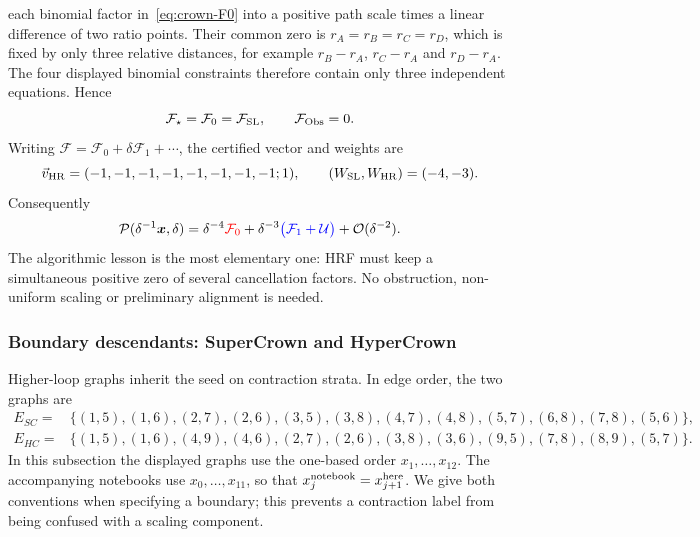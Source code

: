 \documentclass[a4paper,11pt]{article}
\newcommand{\x}{\boldsymbol{x}}
\newcommand{\FSL}{\mathcal F_{\rm SL}}
\newcommand{\FObs}{\mathcal F_{\rm Obs}}
\newcommand{\WSL}{W_{\rm SL}}
\newcommand{\WHR}{W_{\rm HR}}
\newcommand{\vHR}{\vec v_{\rm HR}}
\newcommand{\SLcolour}[1]{{\color{red}#1}}
\newcommand{\HRcolour}[1]{{\color{blue}#1}}
\newcommand{\Othercolour}[1]{{\color{black}#1}}
\begin{document}
each binomial factor in~\eqref{eq:crown-F0} into a positive path scale times
a linear difference of two ratio points.  Their common zero is
\(r_A=r_B=r_C=r_D\), which is fixed by only three relative distances, for
example \(r_B-r_A\), \(r_C-r_A\) and \(r_D-r_A\).  The four displayed
binomial constraints therefore contain only three independent equations.
Hence
\begin{equation}
 \mathcal F_\star=\mathcal F_0=\FSL,
 \qquad \FObs=0.
 \label{eq:crown-no-obstruction}
\end{equation}
Writing \(\mathcal F=\mathcal F_0+\delta\mathcal F_1+\cdots\), the certified
vector and weights are
\begin{equation}
 \vHR=(-1,-1,-1,-1,-1,-1,-1,-1;1),
 \qquad (\WSL,\WHR)=(-4,-3).
 \label{eq:crown-vector}
\end{equation}
Consequently
\begin{equation}
 \mathcal P(\delta^{-1}\x,\delta)
 =\delta^{-4}\SLcolour{\mathcal F_0}
 +\delta^{-3}\HRcolour{\bigl(\mathcal F_1+\mathcal U\bigr)}
 +\Othercolour{\mathcal O(\delta^{-2})}.
 \label{eq:crown-colours}
\end{equation}
The algorithmic lesson is the most elementary one: HRF must keep a
simultaneous positive zero of several cancellation factors.  No obstruction,
non-uniform scaling or preliminary alignment is needed.

\subsubsection{Boundary descendants: SuperCrown and HyperCrown}
\label{sec:example-crown-boundaries}

Higher-loop graphs inherit the seed on contraction strata.  In edge
order, the two graphs are
\begin{align}
E_{SC}={}&\{(1,5),(1,6),(2,7),(2,6),(3,5),(3,8),
 (4,7),(4,8),(5,7),(6,8),(7,8),(5,6)\},
\nonumber\\
E_{HC}={}&\{(1,5),(1,6),(4,9),(4,6),(2,7),(2,6),
 (3,8),(3,6),(9,5),(7,8),(8,9),(5,7)\}.
\label{eq:crown-descendant-edges}
\end{align}
In this subsection the displayed graphs use the one-based order
\(x_1,\ldots,x_{12}\).  The accompanying notebooks use
\(x_0,\ldots,x_{11}\), so that
\(x_j^{\rm notebook}=x_{j+1}^{\rm here}\).  We give both conventions when
specifying a boundary; this prevents a contraction label from being confused
with a scaling component.
\end{document}
